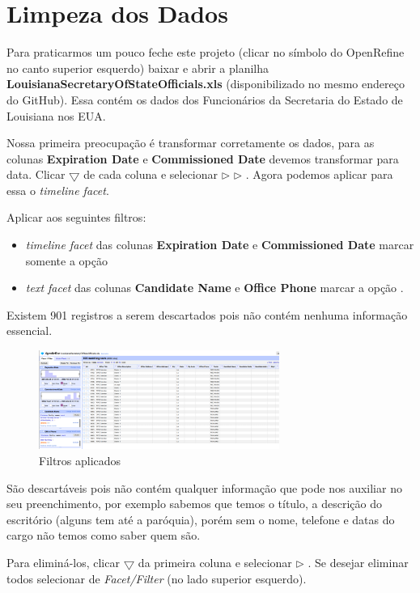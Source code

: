 \documentclass[a4paper,11pt]{article}
\begin{document}
\section{Limpeza dos Dados}
Para praticarmos um pouco feche este projeto (clicar no símbolo do OpenRefine no canto superior esquerdo) baixar e abrir a planilha \textbf{LouisianaSecretaryOfStateOfficials.xls} (disponibilizado no mesmo endereço do GitHub). Essa contém os dados dos Funcionários da Secretaria do Estado de Louisiana nos EUA.

Nossa primeira preocupação é transformar corretamente os dados, para as colunas \textbf{Expiration Date} e \textbf{Commissioned Date} devemos transformar para data. Clicar $\bigtriangledown$ de cada coluna e selecionar  $\triangleright$  $\triangleright$ . Agora podemos aplicar para essa o \textit{timeline facet}.

Aplicar aos seguintes filtros: \vspace{-1em}
\begin{itemize}
	\item \textit{timeline facet} das colunas \textbf{Expiration Date} e \textbf{Commissioned Date} marcar somente a opção 
	\item \textit{text facet} das colunas \textbf{Candidate Name} e \textbf{Office Phone} marcar a opção .
\end{itemize}

Existem 901 registros a serem descartados pois não contém nenhuma informação essencial.
\begin{figure}[H]
	\centering
	\includegraphics[width=0.7\textwidth]{imagem/limpeza1.png}
	\caption{Filtros aplicados}
\end{figure}

São descartáveis pois não contém qualquer informação que pode nos auxiliar no seu preenchimento, por exemplo sabemos que temos o título, a descrição do escritório (alguns tem até a paróquia), porém sem o nome, telefone e datas do cargo não temos como saber quem são.

Para eliminá-los, clicar $\bigtriangledown$ da primeira coluna e selecionar  $\triangleright$ . Se desejar eliminar todos selecionar  de \textit{Facet/Filter} (no lado superior esquerdo).
\end{document}
